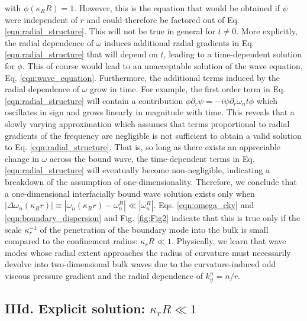 \documentclass[%
 reprint,
superscriptaddress,
longbibliography,
 amsmath,amssymb,
 prl,
 citeautoscript,
]{revtex4-1}
\begin{document}
with $\phi \left( \kappa_R R \right) = 1$. However, this is the equation that would be obtained if $\psi$ were independent of $r$ and could therefore be factored out of Eq. \ref{eqn:radial_structure}. This will not be true in general for $t \neq 0$. More explicitly, the radial dependence of $\omega$ induces additional radial gradients in Eq. \ref{eqn:radial_structure} that will depend on $t$, leading to a time-dependent solution for $\phi$. This of course would lead to an unacceptable solution of the wave equation, Eq. \ref{eqn:wave_equation}. Furthermore, the additional terms induced by the radial dependence of $\omega$ grow in time. For example, the first order term in Eq. \ref{eqn:radial_structure} will contain a contribution $\phi \partial_r \psi = - i \psi \partial_r \omega_n t \phi$ which oscillates in sign and grows linearly in magnitude with time. This reveals that a slowly varying approximation which assumes that terms proportional to radial gradients of the frequency are negligible is not sufficient to obtain a valid solution to Eq. \ref{eqn:radial_structure}. That is, so long as there exists an appreciable change in $\omega$ across the bound wave, the time-dependent terms in Eq. \ref{eqn:radial_structure} will eventually become non-negligible, indicating a breakdown of the assumption of one-dimensionality. Therefore, we conclude that a one-dimensional interfacially bound wave solution exists only when $\left| \Delta \omega_n \left( \kappa_R r \right) \right| \equiv \left| \omega_n \left( \kappa_R r \right) - \omega_n^R \right| \ll \left| \omega_n^R \right|$. Eqs. \ref{eqn:omega_cky} and \ref{eqn:boundary_dispersion} and Fig. \ref{fig:Fig2} indicate that this is true only if the scale $\kappa_r^{-1}$ of the penetration of the boundary mode into the bulk is small compared to the confinement radius: $\kappa_r R \ll 1$. Physically, we learn that wave modes whose radial extent approaches the radius of curvature must necessarily devolve into two-dimensional bulk waves due to the curvature-induced odd viscous pressure gradient and the radial dependence of $k_y^n = n/r$.

\subsection{IIId. Explicit solution: $\kappa_r R \ll 1$}
\end{document}
